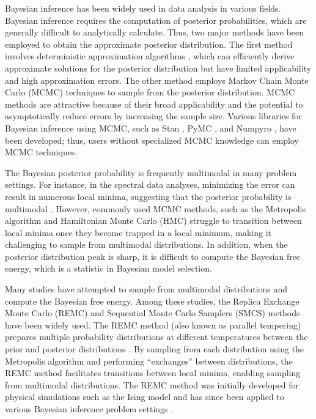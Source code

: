 \documentclass[12pt]{article}
\begin{document}
Bayesian inference has been widely used in data analysis in various fields.
Bayesian inference requires the computation of posterior probabilities, which are generally difficult to analytically calculate.
Thus, two major methods have been employed to obtain the approximate posterior distribution.
The first method involves deterministic approximation algorithms \cite{sun2013review}, which can efficiently derive approximate solutions for the posterior distribution but have limited applicability and high approximation errors.
The other method employs Markov Chain Monte Carlo (MCMC) techniques to sample from the posterior distribution.
MCMC methods are attractive because of their broad applicability and the potential to asymptotically reduce errors by increasing the sample size.
Various libraries for Bayesian inference using MCMC, such as Stan \cite{carpenter2017stan}, PyMC \cite{patil2010pymc}, and Numpyro \cite{phan2019composable}, have been developed; thus, users without specialized MCMC knowledge can employ MCMC techniques. \par

The Bayesian posterior probability is frequently multimodal in many problem settings. 
For instance, in the spectral data analyses, minimizing the error can result in numerous local minima, suggesting that the posterior probability is multimodal \cite{Nagata2012}.
However, commonly used MCMC methods, such as the Metropolis algorithm \cite{metropolis1953equation} and Hamiltonian Monte Carlo (HMC) \cite{neal2011mcmc} struggle to transition between local minima once they become trapped in a local minimum, making it challenging to sample from multimodal distributions.
In addition, when the posterior distribution peak is sharp, it is difficult to compute the Bayesian free energy, which is a statistic in Bayesian model selection. \par

Many studies have attempted to sample from multimodal distributions and compute the Bayesian free energy.
Among these studies, the Replica Exchange Monte Carlo (REMC) and Sequential Monte Carlo Samplers (SMCS) methods have been widely used.
The REMC method (also known as parallel tempering) prepares multiple probability distributions at different temperatures between the prior and posterior distributions \cite{geyer1991markov, Hukushima1996}. 
By sampling from each distribution using the Metropolis algorithm and performing ``exchanges'' between distributions, the REMC method facilitates transitions between local minima, enabling sampling from multimodal distributions. 
The REMC method was initially developed for physical simulations such as the Ising model and has since been applied to various Bayesian inference problem settings \cite{von2011bayesian,sambridge2014parallel}.
\end{document}

